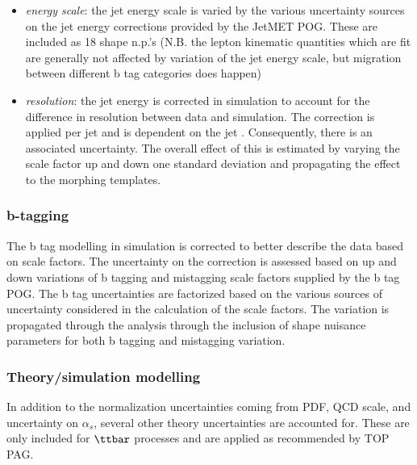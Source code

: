     \begin{itemize}
        \item \textit{energy scale}: the jet energy scale is varied by
            the various uncertainty sources on the jet energy
            corrections provided by the JetMET POG.  These are included
            as 18 shape n.p.'s (N.B. the lepton kinematic quantities
            which are fit are generally not affected by variation of the
            jet energy scale, but migration between different b tag
            categories does happen)
        \item \textit{resolution}: the jet energy is corrected in
            simulation to account for the difference in resolution
            between data and simulation.  The correction is applied per
            jet and is dependent on the jet \pt.  Consequently, there is
            an associated uncertainty.  The overall effect of this is
            estimated by varying the scale factor up and down one
            standard deviation and propagating the effect to the
            morphing templates.
    \end{itemize}

\subsubsection{b-tagging}
    
The b tag modelling in simulation is corrected to better describe the
data based on scale factors.  The uncertainty on the correction is
assessed based on up and down variations of b tagging and mistagging
scale factors supplied by the b tag POG.  The b tag uncertainties are
factorized based on the various sources of uncertainty considered in the
calculation of the scale factors.  The variation is propagated through
the analysis through the inclusion of shape nuisance parameters for both
b tagging and mistagging variation.

\subsubsection{Theory/simulation modelling}

In addition to the normalization uncertainties coming from PDF, QCD
scale, and uncertainty on $\alpha_{s}$, several other theory
uncertainties are accounted for.  These are only included for $\ttbar$
processes and are applied as recommended by TOP PAG.

